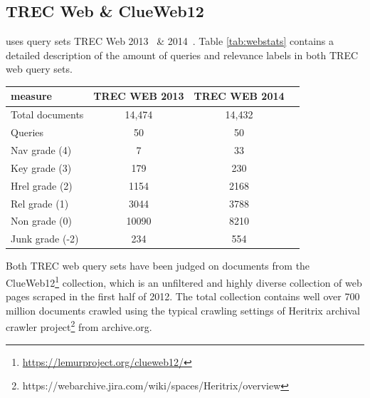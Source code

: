 \subsection{TREC Web \& ClueWeb12 }\label{sec:trecclue}
\datasetname uses query sets TREC Web 2013~\cite{collins2013trec} \& 2014~\cite{collins2015trec}. Table \ref{tab:webstats} contains a detailed description of the amount of queries and relevance labels in both TREC web query sets.

\begin{center}
  \begin{tabular}{ l | c | c | c }
    measure & TREC WEB 2013 & TREC WEB 2014 \\
    \hline
    Total documents & 14,474 & 14,432 \\
    Queries & 50 & 50 \\
    Nav grade (4) & 7 & 33 \\
    Key grade (3) & 179 & 230 \\
    Hrel grade (2) & 1154 & 2168 \\
    Rel grade (1) & 3044 & 3788 \\
    Non grade (0) & 10090 & 8210 \\
    Junk grade (-2) & 234 & 554 \\
    \hline
  \end{tabular}
   \label{tab:webstats} 
\end{center}

Both TREC web query sets have been judged on documents from the  ClueWeb12\footnote{\url{https://lemurproject.org/clueweb12/}} collection, which is an unfiltered and highly diverse collection of web pages scraped in the first half of 2012. The total collection contains well over 700 million documents crawled using the typical crawling settings of Heritrix archival crawler project\footnote{https://webarchive.jira.com/wiki/spaces/Heritrix/overview} from archive.org.  

